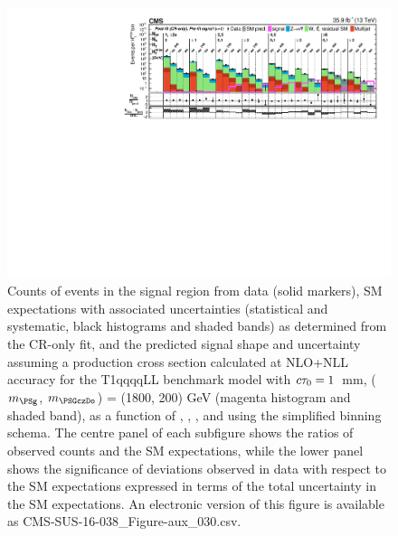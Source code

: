 \begin{figure}[p]
    \begin{center}
        \includegraphics[width=1.00\textwidth]{Supplementary/CMS-SUS-16-038_Figure-aux_030.pdf}
  \caption{Counts of events in the signal region from data (solid markers), SM expectations
    with associated uncertainties (statistical and systematic, black
    histograms and shaded bands) as determined from the CR-only fit,
    and the predicted signal shape and uncertainty assuming a production cross
    section calculated at NLO+NLL accuracy for the
        T1qqqqLL benchmark model with $c\tau_{0}=1$~mm, ($m_{\PSg}$, $m_{\PSGczDo}$) = (1800, 200) GeV
    (magenta histogram and shaded band),
    as a function of \njet, \nb, \scalht, and \mht using the simplified binning schema.
    The centre panel of each subfigure shows the ratios of
    observed counts and the SM expectations, while the lower panel
    shows the significance of deviations observed in data with respect
    to the SM expectations expressed in terms of the total uncertainty
    in the SM expectations.  
	An electronic version of this figure is available as CMS-SUS-16-038\_Figure-aux\_030.csv.
        }
        \label{fig:T1qqqqLL_1_1800_200_MR_sig}
    \end{center}
\end{figure}

